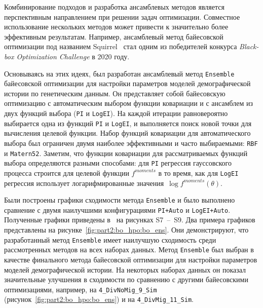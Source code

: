 Комбинирование подходов и разработка ансамблевых методов является перспективным направлением при решении задач оптимизации.
Совместное использование нескольких методов может привести к значительно более эффективным результатам.
Например, ансамблевый метод байесовской оптимизации под названием Squirrel~\cite{awad2020squirrel} стал одним из победителей конкурса \emph{Black-box Optimization Challenge} в 2020 году.

Основываясь на этих идеях, был разработан ансамблевый метод \texttt{Ensemble} байесовской оптимизации для настройки параметров моделей демографической истории по генетическим данным.
Он представляет собой байесовскую оптимизацию с автоматическим выбором функции ковариации и с ансамблем из двух функций выбора (\texttt{PI} и \texttt{LogEI}).
На каждой итерации равновероятно выбирается одна из функций \texttt{PI} и \texttt{LogEI}, и выполняется поиск новой точки для вычисления целевой функции.
Набор функций ковариации для автоматического выбора был ограничен двумя наиболее эффективными и часто выбираемыми: \texttt{RBF} и \texttt{Matern52}.
Заметим, что функции ковариации для рассматриваемых функций выбора определяются разными способами: для \texttt{PI} регрессия гауссовского процесса строится для целевой функции $f^{moments}$ в то время, как для \texttt{LogEI} регрессия использует логарифмированные значения~$\log f^{moments}(\theta)$.

Были построены графики сходимости метода \texttt{Ensemble} и было выполнено сравнение с двумя наилучшими конфигурациями \texttt{PI+Auto} и \texttt{LogEI+Auto}.
Полученные графики приведены в~\cite{noskova2023bayesian} на рисунках S7~--~S9.
Два примера графиков представлены на рисунке~\ref{fig:part2:bo_hpo:bo_ens}.
Они демонстрируют, что разработанный метод \texttt{Ensemble} имеет наилучшую сходимость среди рассмотренных методов на всех наборах данных.
Метод \texttt{Ensemble} был выбран в качестве финального метода байесовской оптимизации для настройки параметров моделей демографической истории.
На некоторых наборах данных он показал значительные улучшения в сходимости по сравнению с другими байесовскими оптимизациями, например, на \texttt{4\_DivNoMig\_9\_Sim} (рисунок~\ref{fig:part2:bo_hpo:bo_ens}) и на \texttt{4\_DivMig\_11\_Sim}.

